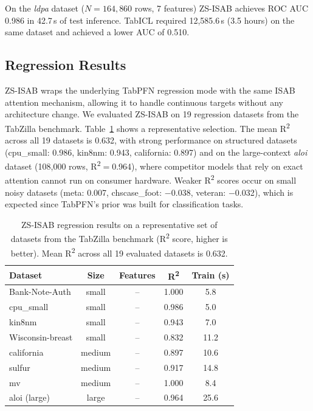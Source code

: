 \documentclass[10pt]{article}
\begin{document}
On the \textit{ldpa} dataset ($N = 164{,}860$ rows, 7 features) ZS-ISAB achieves ROC AUC 0.986 in 42.7\,s of test inference. TabICL required 12{,}585.6\,s (3.5 hours) on the same dataset and achieved a lower AUC of 0.510.

\subsection{Regression Results}

ZS-ISAB wraps the underlying TabPFN regression mode with the same ISAB attention mechanism, allowing it to handle continuous targets without any architecture change. We evaluated ZS-ISAB on 19 regression datasets from the TabZilla benchmark. Table~\ref{tab:regression} shows a representative selection. The mean R\textsuperscript{2} across all 19 datasets is 0.632, with strong performance on structured datasets (cpu\_small: 0.986, kin8nm: 0.943, california: 0.897) and on the large-context \textit{aloi} dataset (108{,}000 rows, R\textsuperscript{2}$=$0.964), where competitor models that rely on exact attention cannot run on consumer hardware. Weaker R\textsuperscript{2} scores occur on small noisy datasets (meta: 0.007, chscase\_foot: $-$0.038, veteran: $-$0.032), which is expected since TabPFN's prior was built for classification tasks.

\begin{table}[htbp]
\centering
\caption{ZS-ISAB regression results on a representative set of datasets from the TabZilla benchmark (R\textsuperscript{2} score, higher is better). Mean R\textsuperscript{2} across all 19 evaluated datasets is 0.632.}
\label{tab:regression}
\small
\begin{tabular}{@{}lcccc@{}}
\toprule
\textbf{Dataset} & \textbf{Size} & \textbf{Features} & \textbf{R\textsuperscript{2}} & \textbf{Train (s)} \\
\midrule
Bank-Note-Auth       & small  & --   & 1.000 & 5.8  \\
cpu\_small           & small  & --   & 0.986 & 5.0  \\
kin8nm               & small  & --   & 0.943 & 7.0  \\
Wisconsin-breast     & small  & --   & 0.832 & 11.2 \\
california           & medium & --   & 0.897 & 10.6 \\
sulfur               & medium & --   & 0.917 & 14.8 \\
mv                   & medium & --   & 1.000 & 8.4  \\
aloi (large)         & large  & --   & 0.964 & 25.6 \\
\bottomrule
\end{tabular}
\end{table}
\end{document}

